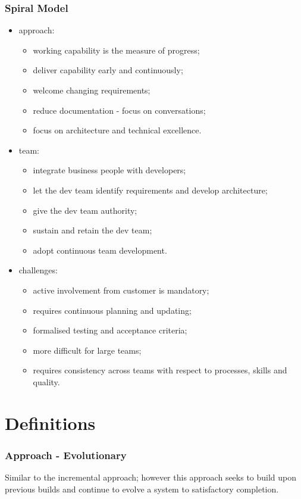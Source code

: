\documentclass[journal]{IEEEtran}
\begin{document}
\subsubsection{Spiral Model}
\begin{itemize}
	\item approach:
	\begin{itemize}
		\item working capability is the measure of progress;
		\item deliver capability early and continuously;
		\item welcome changing requirements;
		\item reduce documentation - focus on conversations;
		\item focus on architecture and technical excellence.
	\end{itemize}
	\item team:
	\begin{itemize}
		\item integrate business people with developers;
		\item let the dev team identify requirements and develop architecture;
		\item give the dev team authority;
		\item sustain and retain the dev team;
		\item adopt continuous team development.
	\end{itemize}
	\item challenges:
	\begin{itemize}
		\item active involvement from customer is mandatory;
		\item requires continuous planning and updating;
		\item formalised testing and acceptance criteria;
		\item more difficult for large teams;
		\item requires consistency across teams with respect to processes, skills and quality.
	\end{itemize}
\end{itemize}
\section{Definitions}
\subsubsection{Approach - Evolutionary}
Similar to the incremental approach; however this approach seeks to build upon previous builds and continue to evolve a system to satisfactory completion.
\end{document}
